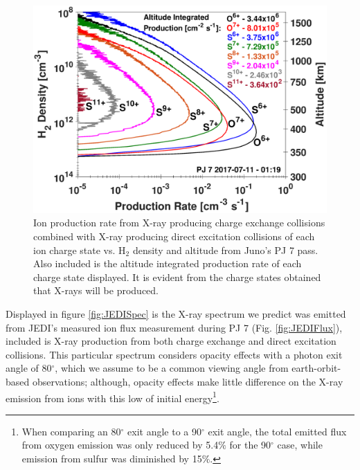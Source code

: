 \documentclass[draft]{agujournal2018}
\begin{document}
\begin{figure}[ht]
    \centering
    \includegraphics[width=\textwidth]{Figures/PJ7IonProd.eps}
    \caption{Ion production rate from X-ray producing charge exchange collisions combined with X-ray producing direct excitation collisions of each ion charge state vs. H$_2$ density and altitude from Juno's PJ 7 pass. Also included is the altitude integrated production rate of each charge state displayed. It is evident from the charge states obtained that X-rays will be produced.}
    \label{fig:JEDIIonProd}
\end{figure}

Displayed in figure \ref{fig:JEDISpec} is the X-ray spectrum we predict was emitted from JEDI's measured ion flux measurement during PJ 7 (Fig. \ref{fig:JEDIFlux}), included is X-ray production from both charge exchange and direct excitation collisions.
This particular spectrum considers opacity effects with a photon exit angle of 80$^{\circ}$, which we assume to be a common viewing angle from earth-orbit-based observations; although, opacity effects make little difference on the X-ray emission from ions with this low of initial energy\footnote{When comparing an 80$^{\circ}$ exit angle to a 90$^{\circ}$ exit angle, the total emitted flux from oxygen emission was only reduced by 5.4$\%$ for the 90$^{\circ}$ case, while emission from sulfur was diminished by 15$\%$.}.
\end{document}
